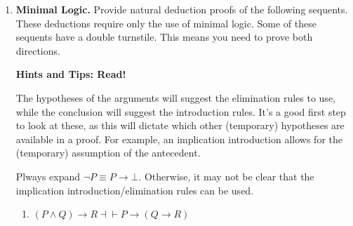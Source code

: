 \documentclass[11pt]{report}
\begin{document}
\begin{enumerate}
\begin{enumerate}
		\item Extend the proof above, through the use of implication introduction, to a proof of the original sequent.
		
		\hspace{0.2cm}{\bf Solution}

		To prove the original sequent, we have to undo each application of the deduction theorem i.e. introduce the implication back to the consequent. 

		\begin{mdframed}
			\begin{center}
				$\begin{array}{c}
					\infer[\to I,3]{(P \to Q) \to (\lnot Q \to \lnot P)}
						{\infer[\to I,2]{\lnot Q \to \lnot P}
							{\infer[\to I,1]{\lnot P}
								{\infer[\MP]{\bot}
								{\infer[\MP]{Q}{\infer[1]{\cancel{P}}{} & \infer[3]{\cancel{P \to Q}}{}} & \infer[2]{\cancel{\lnot Q}}{}}}								
							}}
				\end{array}$
			\end{center}
		\end{mdframed}

	\end{enumerate}	
	
	\newpage
	\item \textbf{Minimal Logic.} Provide natural deduction proofs of the following sequents. These deductions require only the use of minimal logic. Some of these sequents have a double turnstile. This means you need to prove both directions. 
	
	\vspace{0.2cm}

	{\bf Hints and Tips: Read!}

	The hypotheses of the arguments will suggest the elimination rules to use, while the conclusion will suggest the introduction rules. It's a good first step to look at these, as this will dictate which other (temporary) hypotheses are available in a proof. For example, an implication introduction allows for the (temporary) assumption of the antecedent. 

	Plways expand $\lnot P \equiv P \to \bot$. Otherwise, it may not be clear that the implication introduction/elimination rules can be used.

	\begin{enumerate}
		\item $(P \land Q) \to R \dashv\vdash P \to (Q \to R) $
		
		\hspace{0.2cm}{\bf Solution}
		

\end{enumerate}
\end{enumerate}
\end{document}
